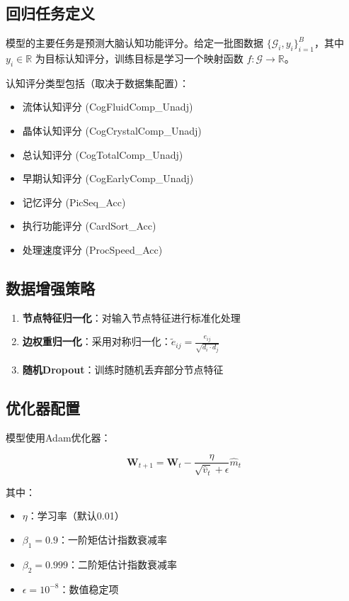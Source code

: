 \documentclass[UTF8, a4paper, 12pt]{article}
\begin{document}
\subsection{回归任务定义}

模型的主要任务是预测大脑认知功能评分。给定一批图数据 $\{\mathcal{G}_i, y_i\}_{i=1}^{B}$，其中 $y_i \in \mathbb{R}$ 为目标认知评分，训练目标是学习一个映射函数 $f: \mathcal{G} \rightarrow \mathbb{R}$。

认知评分类型包括（取决于数据集配置）：
\begin{itemize}
    \item 流体认知评分 (CogFluidComp\_Unadj)
    \item 晶体认知评分 (CogCrystalComp\_Unadj)
    \item 总认知评分 (CogTotalComp\_Unadj)
    \item 早期认知评分 (CogEarlyComp\_Unadj)
    \item 记忆评分 (PicSeq\_Acc)
    \item 执行功能评分 (CardSort\_Acc)
    \item 处理速度评分 (ProcSpeed\_Acc)
\end{itemize}

\subsection{数据增强策略}

\begin{enumerate}
    \item \textbf{节点特征归一化}：对输入节点特征进行标准化处理
    \item \textbf{边权重归一化}：采用对称归一化：$\tilde{e}_{ij} = \frac{e_{ij}}{\sqrt{d_i \cdot d_j}}$
    \item \textbf{随机Dropout}：训练时随机丢弃部分节点特征
\end{enumerate}

\subsection{优化器配置}

模型使用Adam优化器：

\begin{equation}
\mathbf{W}_{t+1} = \mathbf{W}_t - \frac{\eta}{\sqrt{\hat{v}_t} + \epsilon} \hat{m}_t
\end{equation}

其中：
\begin{itemize}
    \item $\eta$：学习率（默认0.01）
    \item $\beta_1 = 0.9$：一阶矩估计指数衰减率
    \item $\beta_2 = 0.999$：二阶矩估计指数衰减率
    \item $\epsilon = 10^{-8}$：数值稳定项
\end{itemize}
\end{document}
